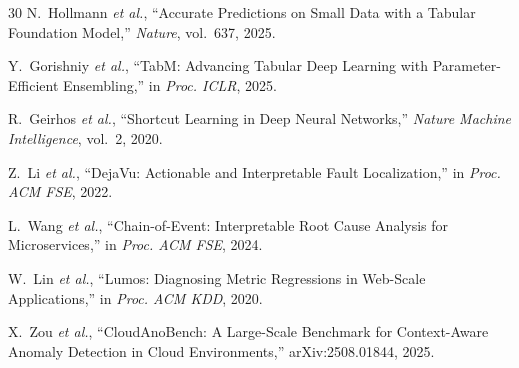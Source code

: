 \documentclass[12pt,a4paper]{report}
\begin{document}
\begin{thebibliography}{30}
N.~Hollmann \emph{et al.}, ``Accurate Predictions on Small Data with a Tabular Foundation Model,'' \emph{Nature}, vol.~637, 2025.

Y.~Gorishniy \emph{et al.}, ``TabM: Advancing Tabular Deep Learning with Parameter-Efficient Ensembling,'' in \emph{Proc. ICLR}, 2025.

R.~Geirhos \emph{et al.}, ``Shortcut Learning in Deep Neural Networks,'' \emph{Nature Machine Intelligence}, vol.~2, 2020.

Z.~Li \emph{et al.}, ``DejaVu: Actionable and Interpretable Fault Localization,'' in \emph{Proc. ACM FSE}, 2022.

L.~Wang \emph{et al.}, ``Chain-of-Event: Interpretable Root Cause Analysis for Microservices,'' in \emph{Proc. ACM FSE}, 2024.

W.~Lin \emph{et al.}, ``Lumos: Diagnosing Metric Regressions in Web-Scale Applications,'' in \emph{Proc. ACM KDD}, 2020.

X.~Zou \emph{et al.}, ``CloudAnoBench: A Large-Scale Benchmark for Context-Aware Anomaly Detection in Cloud Environments,'' arXiv:2508.01844, 2025.

\end{thebibliography}
\endgroup
\end{document}
